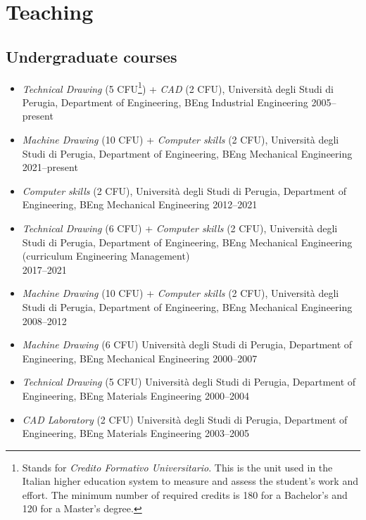 \documentclass[11pt]{article}
\begin{document}
\section*{Teaching}

\subsection*{Undergraduate courses}

\begin{itemize}	
	\item \emph{Technical Drawing} (5 CFU\footnote{Stands for \emph{Credito Formativo Universitario}. This is the unit used in the Italian higher education system to measure and assess the student's work and effort. The minimum number of required credits is 180 for a Bachelor's and 120 for a Master's degree.}) + \emph{CAD} (2 CFU), Università degli Studi di Perugia, Department of Engineering, BEng Industrial Engineering \mbox{} \hfill 2005--present
	
	\item \emph{Machine Drawing} (10 CFU) + \emph{Computer skills} (2 CFU), Università degli Studi di Perugia, Department of Engineering, BEng Mechanical Engineering \mbox{} \hfill 2021--present

\item \emph{Computer skills} (2 CFU), Università degli Studi di Perugia, Department of Engineering, BEng Mechanical Engineering \mbox{} \hfill 2012--2021
	\item \emph{Technical Drawing} (6 CFU) + \emph{Computer skills} (2 CFU), Università degli Studi di Perugia, Department of Engineering, BEng Mechanical Engineering (curriculum Engineering Management) \\ \mbox{} \hfill 2017--2021
	\item \emph{Machine Drawing} (10 CFU) + \emph{Computer skills} (2 CFU), Università degli Studi di Perugia, Department of Engineering, BEng Mechanical Engineering \mbox{} \hfill 2008--2012
	\item \emph{Machine Drawing} (6 CFU) Università degli Studi di Perugia, Department of Engineering, BEng Mechanical Engineering \mbox{} \hfill 2000--2007
  \item \emph{Technical Drawing} (5 CFU) Università degli Studi di Perugia, Department of Engineering, BEng Materials Engineering \mbox{} \hfill 2000--2004
 
 \item \emph{CAD Laboratory} (2 CFU) Università degli Studi di Perugia, Department of Engineering, BEng Materials Engineering \mbox{} \hfill 2003–2005
\end{itemize}
\end{document}
